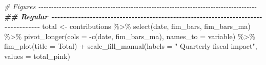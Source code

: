 \documentclass[
]{article}
\newenvironment{Shaded}{\begin{snugshade}}{\end{snugshade}}
\newcommand{\AttributeTok}[1]{\textcolor[rgb]{0.77,0.63,0.00}{#1}}
\newcommand{\CommentTok}[1]{\textcolor[rgb]{0.56,0.35,0.01}{\textit{#1}}}
\newcommand{\DocumentationTok}[1]{\textcolor[rgb]{0.56,0.35,0.01}{\textbf{\textit{#1}}}}
\newcommand{\FunctionTok}[1]{\textcolor[rgb]{0.00,0.00,0.00}{#1}}
\newcommand{\NormalTok}[1]{#1}
\newcommand{\OtherTok}[1]{\textcolor[rgb]{0.56,0.35,0.01}{#1}}
\newcommand{\SpecialCharTok}[1]{\textcolor[rgb]{0.00,0.00,0.00}{#1}}
\newcommand{\StringTok}[1]{\textcolor[rgb]{0.31,0.60,0.02}{#1}}
\begin{document}
\begin{Shaded}
\begin{Highlighting}[]
\CommentTok{\# Figures {-}{-}{-}{-}{-}{-}{-}{-}{-}{-}{-}{-}{-}{-}{-}{-}{-}{-}{-}{-}{-}{-}{-}{-}{-}{-}{-}{-}{-}{-}{-}{-}{-}{-}{-}{-}{-}{-}{-}{-}{-}{-}{-}{-}{-}{-}{-}{-}{-}{-}{-}{-}{-}{-}{-}{-}{-}{-}{-}{-}{-}{-}{-}{-}{-}{-}{-}{-}{-}{-}{-}{-}{-}{-}{-}{-}{-}{-}{-}{-}{-}{-}{-}{-}{-}}
\DocumentationTok{\#\# Regular {-}{-}{-}{-}{-}{-}{-}{-}{-}{-}{-}{-}{-}{-}{-}{-}{-}{-}{-}{-}{-}{-}{-}{-}{-}{-}{-}{-}{-}{-}{-}{-}{-}{-}{-}{-}{-}{-}{-}{-}{-}{-}{-}{-}{-}{-}{-}{-}{-}{-}{-}{-}{-}{-}{-}{-}{-}{-}{-}{-}{-}{-}{-}{-}{-}{-}{-}{-}{-}{-}{-}{-}{-}{-}{-}{-}{-}{-}{-}{-}{-}{-}{-}}
\NormalTok{total }\OtherTok{\textless{}{-}}
\NormalTok{  contributions }\SpecialCharTok{\%\textgreater{}\%}
  \FunctionTok{select}\NormalTok{(date, fim\_bars, fim\_bars\_ma) }\SpecialCharTok{\%\textgreater{}\%}
  \FunctionTok{pivot\_longer}\NormalTok{(}\AttributeTok{cols =} \SpecialCharTok{{-}}\FunctionTok{c}\NormalTok{(date, fim\_bars\_ma), }\AttributeTok{names\_to =} \StringTok{\textquotesingle{}variable\textquotesingle{}}\NormalTok{) }\SpecialCharTok{\%\textgreater{}\%}
  \FunctionTok{fim\_plot}\NormalTok{(}\AttributeTok{title =} \StringTok{\textquotesingle{}Total\textquotesingle{}}\NormalTok{) }\SpecialCharTok{+}
  \FunctionTok{scale\_fill\_manual}\NormalTok{(}\AttributeTok{labels =} \StringTok{" Quarterly fiscal impact"}\NormalTok{,}
                    \AttributeTok{values =}\NormalTok{ total\_pink)}
 

\end{Highlighting}
\end{Shaded}
\end{document}
